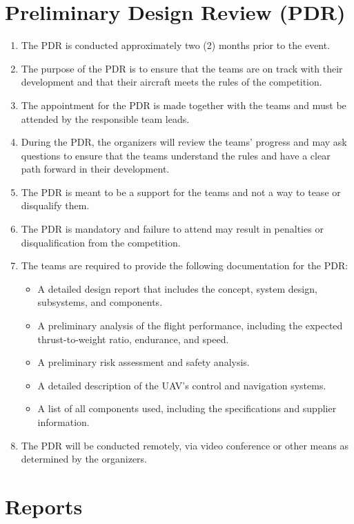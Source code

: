     \section{Preliminary Design Review (PDR)}
    \begin{enumerate}
    \item The PDR is conducted approximately two (2) months prior to the event.
    \item The purpose of the PDR is to ensure that the teams are on track with their development and that their aircraft meets the rules of the competition.
    \item The appointment for the PDR is made together with the teams and must be attended by the responsible team leads.
    \item During the PDR, the organizers will review the teams' progress and may ask questions to ensure that the teams understand the rules and have a clear path forward in their development.
    \item The PDR is meant to be a support for the teams and not a way to tease or disqualify them.
    \item The PDR is mandatory and failure to attend may result in penalties or disqualification from the competition.
    \item The teams are required to provide the following documentation for the PDR:
    \begin{itemize}
    \item A detailed design report that includes the concept, system design, subsystems, and components.
    \item A preliminary analysis of the flight performance, including the expected thrust-to-weight ratio, endurance, and speed.
    \item A preliminary risk assessment and safety analysis.
    \item A detailed description of the UAV's control and navigation systems.
    \item A list of all components used, including the specifications and supplier information.
    \end{itemize}
    \item The PDR will be conducted remotely, via video conference or other means as determined by the organizers.
    \end{enumerate}


    \section{Reports}


